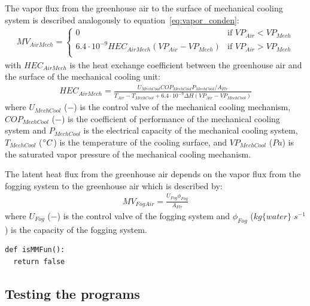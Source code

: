 \documentclass[a4paper]{article}
\begin{document}
The vapor flux from the greenhouse air to the surface of mechanical cooling system is described analogously to equation~\eqref{eq:vapor_conden}:
\begin{align}
  MV_{AirMech} = \begin{cases}
    0                                                     & \text{if~} VP_{Air} < VP_{Mech} \\
    6.4 \cdot 10^{-9} HEC_{AirMech}(VP_{Air} - VP_{Mech}) & \text{if~} VP_{Air} > VP_{Mech} \\
  \end{cases}
\end{align}
with \(HEC_{AirMech}\) is the heat exchange coefficient between the greenhouse air and the surface of the mechanical cooling unit:
\begin{align}
  HEC_{AirMech} = \frac{U_{MechCool} COP_{MechCool} P_{MechCool} / A_{Flr}}{T_{Air} - T_{MechCool} + 6.4 \cdot 10^{-9} \Delta H(VP_{Air} - VP_{MechCool})}
\end{align}
where \(U_{MechCool}\) (\(-\)) is the control valve of the mechanical cooling mechanism, \(COP_{MechCool}\) (\(-\)) is the coefficient of performance of the mechanical cooling system and \(P_{MechCool}\) is the electrical capacity of the mechanical cooling system, \(T_{MechCool}\) (\(\degree C\)) is the temperature of the cooling surface, and \(VP_{MechCool}\) (\(Pa\)) is the saturated vapor pressure of the mechanical cooling mechanism.

The latent heat flux from the greenhouse air depends on the vapor flux from the fogging system to the greenhouse air which is described by:
\begin{align}
  MV_{FogAir} = \frac{U_{Fog} \phi_{Fog}}{A_{Flr}}
\end{align}
where \(U_{Fog}\) (\(-\)) is the control valve of the fogging system and \(\phi_{Fog}\) (\(kg\{water\}\;s^{-1}\)) is the capacity of the fogging system.

\begin{mdframed}[leftline=false,rightline=false,backgroundcolor=magenta!10]
  \begin{verbatim}
def isMMFun():
  return false
  \end{verbatim}
\end{mdframed}

\subsection{Testing the programs}
\end{document}
